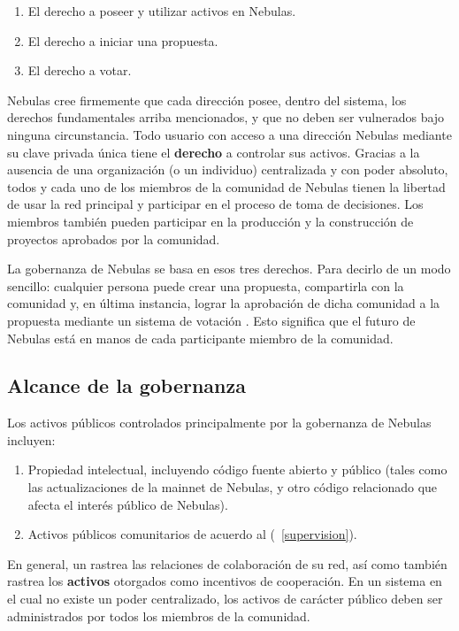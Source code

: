 \begin{enumerate}
	\item El derecho a poseer y utilizar activos en Nebulas.
	\item El derecho a iniciar una propuesta.
	\item El derecho a votar.
\end{enumerate}

Nebulas cree firmemente que cada dirección posee, dentro del sistema, los derechos fundamentales arriba mencionados, y que no deben ser vulnerados bajo ninguna circunstancia. Todo usuario con acceso a una dirección Nebulas mediante su clave privada única tiene el \textbf{derecho} a controlar sus activos. Gracias a la ausencia de una organización (o un individuo) centralizada y con poder absoluto, todos y cada uno de los miembros de la comunidad de Nebulas tienen la libertad de usar la red principal y participar en el proceso de toma de decisiones. Los miembros también pueden participar en la producción y la construcción de proyectos aprobados por la comunidad.

La gobernanza de Nebulas se basa en esos tres derechos. Para decirlo de un modo sencillo: cualquier persona puede crear una propuesta, compartirla con la comunidad y, en última instancia, lograr la aprobación de dicha comunidad a la propuesta mediante un sistema de votación \onchain. Esto significa que el futuro de Nebulas está en manos de cada participante miembro de la comunidad.

\subsection{Alcance de la gobernanza}

Los activos públicos controlados principalmente por la gobernanza de Nebulas incluyen:

\begin{enumerate}
	\item Propiedad intelectual, incluyendo código fuente abierto y público (tales como las actualizaciones de la mainnet de Nebulas, y otro código relacionado que afecta el interés público de Nebulas).
	\item Activos públicos comunitarios de acuerdo al \ntechw (~\ref{supervision}).
\end{enumerate}

En general, un \blockchain rastrea las relaciones de colaboración de su red, así como también rastrea los \textbf{activos} otorgados como incentivos de cooperación. En un sistema en el cual no existe un poder centralizado, los activos de carácter público deben ser administrados por todos los miembros de la comunidad.

